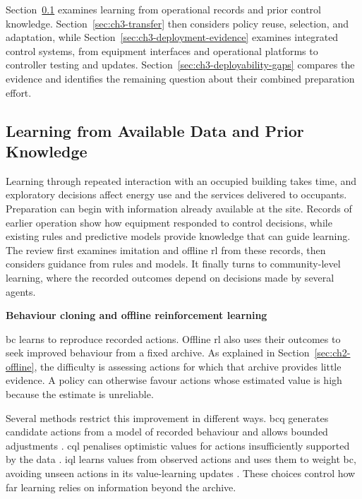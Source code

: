 Section~\ref{sec:ch3-data-prior-knowledge} examines learning from operational records and prior control knowledge. Section~\ref{sec:ch3-transfer} then considers policy reuse, selection, and adaptation, while Section~\ref{sec:ch3-deployment-evidence} examines integrated control systems, from equipment interfaces and operational platforms to controller testing and updates. Section~\ref{sec:ch3-deployability-gaps} compares the evidence and identifies the remaining question about their combined preparation effort.

\subsection{Learning from Available Data and Prior Knowledge}
\label{sec:ch3-data-prior-knowledge}
\label{sec:ch2-experience-literature}

Learning through repeated interaction with an occupied building takes time, and exploratory decisions affect energy use and the services delivered to occupants. Preparation can begin with information already available at the site. Records of earlier operation show how equipment responded to control decisions, while existing rules and predictive models provide knowledge that can guide learning. The review first examines imitation and offline \gls{rl} from these records, then considers guidance from rules and models. It finally turns to community-level learning, where the recorded outcomes depend on decisions made by several agents.

\smallskip
\noindent\textbf{Behaviour cloning and offline reinforcement learning}\par\nobreak\smallskip
\gls{bc} learns to reproduce recorded actions. Offline \gls{rl} also uses their outcomes to seek improved behaviour from a fixed archive. As explained in Section~\ref{sec:ch2-offline}, the difficulty is assessing actions for which that archive provides little evidence. A policy can otherwise favour actions whose estimated value is high because the estimate is unreliable.

Several methods restrict this improvement in different ways. \gls{bcq} generates candidate actions from a model of recorded behaviour and allows bounded adjustments \parencite{fujimoto2019bcq}. \gls{cql} penalises optimistic values for actions insufficiently supported by the data \parencite{kumar2020cql}. \gls{iql} learns values from observed actions and uses them to weight \gls{bc}, avoiding unseen actions in its value-learning updates \parencite{kostrikov2021iql}. These choices control how far learning relies on information beyond the archive.

